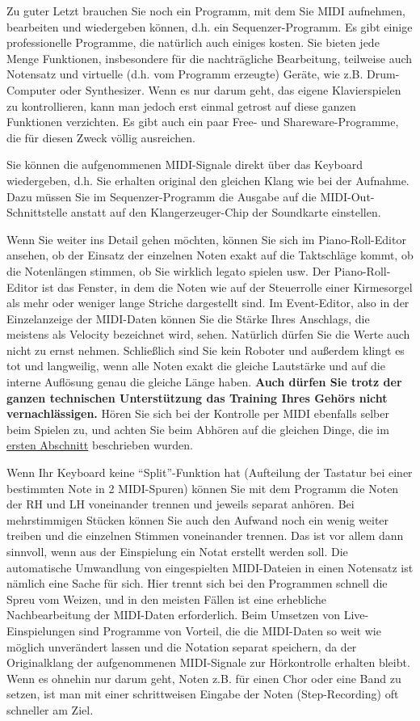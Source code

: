 Zu guter Letzt brauchen Sie noch ein Programm, mit dem Sie MIDI aufnehmen, bearbeiten und wiedergeben können, d.h. ein Sequenzer-Programm.
Es gibt einige professionelle Programme, die natürlich auch einiges kosten.
Sie bieten jede Menge Funktionen, insbesondere für die nachträgliche Bearbeitung, teilweise auch Notensatz und virtuelle (d.h. vom Programm erzeugte) Geräte, wie z.B. Drum-Computer oder Synthesizer.
Wenn es nur darum geht, das eigene Klavierspielen zu kontrollieren, kann man jedoch erst einmal getrost auf diese ganzen Funktionen verzichten.
Es gibt auch ein paar Free- und Shareware-Programme, die für diesen Zweck völlig ausreichen.

Sie können die aufgenommenen MIDI-Signale direkt über das Keyboard wiedergeben, d.h. Sie erhalten original den gleichen Klang wie bei der Aufnahme.
Dazu müssen Sie im Sequenzer-Programm die Ausgabe auf die MIDI-Out-Schnittstelle anstatt auf den Klangerzeuger-Chip der Soundkarte einstellen.

\label{midi_check}

Wenn Sie weiter ins Detail gehen möchten, können Sie sich im Piano-Roll-Editor ansehen, ob der Einsatz der einzelnen Noten exakt auf die Taktschläge kommt, ob die Notenlängen stimmen, ob Sie wirklich legato spielen usw.
Der Piano-Roll-Editor ist das Fenster, in dem die Noten wie auf der Steuerrolle einer Kirmesorgel als mehr oder weniger lange Striche dargestellt sind.
Im Event-Editor, also in der Einzelanzeige der MIDI-Daten können Sie die Stärke Ihres Anschlags, die meistens als Velocity bezeichnet wird, sehen.
Natürlich dürfen Sie die Werte auch nicht zu ernst nehmen. Schließlich sind Sie kein Roboter und außerdem klingt es tot und langweilig, wenn alle Noten exakt die gleiche Lautstärke und auf die interne Auflösung genau die gleiche Länge haben.
\textbf{Auch dürfen Sie trotz der ganzen technischen Unterstützung das Training Ihres Gehörs nicht vernachlässigen.}
Hören Sie sich bei der Kontrolle per MIDI ebenfalls selber beim Spielen zu, und achten Sie beim Abhören auf die gleichen Dinge, die im \hyperref[c1iii13]{ersten Abschnitt} beschrieben wurden.

Wenn Ihr Keyboard keine \enquote{Split}-Funktion hat (Aufteilung der Tastatur bei einer bestimmten Note in 2 MIDI-Spuren) können Sie mit dem Programm die Noten der RH und LH voneinander trennen und jeweils separat anhören.
Bei mehrstimmigen Stücken können Sie auch den Aufwand noch ein wenig weiter treiben und die einzelnen Stimmen voneinander trennen.
Das ist vor allem dann sinnvoll, wenn aus der Einspielung ein Notat erstellt werden soll.
Die automatische Umwandlung von eingespielten MIDI-Dateien in einen Notensatz ist nämlich eine Sache für sich.
Hier trennt sich bei den Programmen schnell die Spreu vom Weizen, und in den meisten Fällen ist eine erhebliche Nachbearbeitung der MIDI-Daten erforderlich.
Beim Umsetzen von Live-Einspielungen sind Programme von Vorteil, die die MIDI-Daten so weit wie möglich unverändert lassen und die Notation separat speichern, da der Originalklang der aufgenommenen MIDI-Signale zur Hörkontrolle erhalten bleibt.
Wenn es ohnehin nur darum geht, Noten z.B. für einen Chor oder eine Band zu setzen, ist man mit einer schrittweisen Eingabe der Noten (Step-Recording) oft schneller am Ziel.


